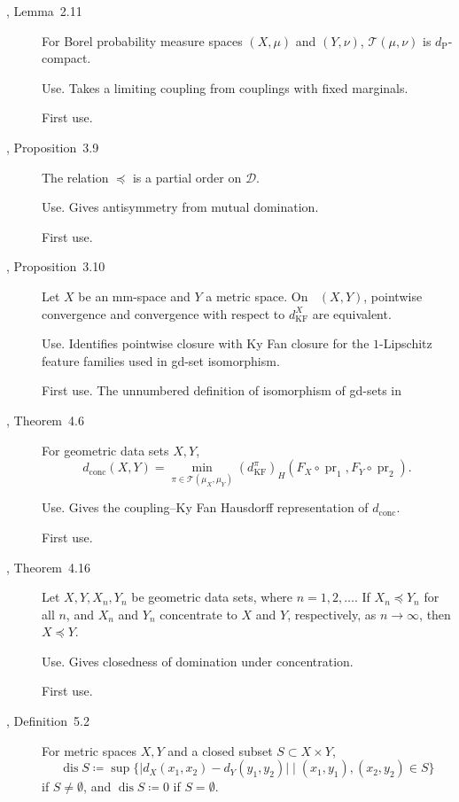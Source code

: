 \documentclass{amsart}
\theoremstyle{plain}
\theoremstyle{definition}
\theoremstyle{remark}
\newcommand{\D}{\mathcal{D}}
\DeclareMathOperator{\lipone}{Lip_1}
\DeclareMathOperator{\dis}{dis}
\DeclareMathOperator{\pr}{pr}
\newcommand{\dconc}{d_{\operatorname{conc}}}
\newcommand{\dpr}{d_{\operatorname{P}}}
\newcommand{\kf}{d_{\operatorname{KF}}}
\newcommand{\haus}[1]{\left(#1\right)_H}
\newcommand{\Tplan}{\mathcal{T}}
\begin{document}
\begin{description}
\item[\cite{gds1}, Lemma~2.11]
For Borel probability measure spaces $(X,\mu)$ and $(Y,\nu)$, $\Tplan(\mu,\nu)$ is $\dpr$-compact.

\textup{Use.} Takes a limiting coupling from couplings with fixed marginals.

\textup{First use.} 

\item[\cite{gds1}, Proposition~3.9]
The relation $\preceq$ is a partial order on $\D$.

\textup{Use.} Gives antisymmetry from mutual domination.

\textup{First use.} 

\item[\cite{gds1}, Proposition~3.10]
Let $X$ be an mm-space and $Y$ a metric space. On $\lipone(X,Y)$, pointwise convergence and convergence with respect to $\kf^X$ are equivalent.

\textup{Use.} Identifies pointwise closure with Ky Fan closure for the $1$-Lipschitz feature families used in gd-set isomorphism.

\textup{First use.} The unnumbered definition of isomorphism of gd-sets in 

\item[\cite{gds1}, Theorem~4.6]
For geometric data sets $X,Y$,
\[\dconc(X,Y)=\min_{\pi\in\Tplan(\mu_X,\mu_Y)}\haus{\kf^\pi}(F_X\circ\pr_1,F_Y\circ\pr_2).\]

\textup{Use.} Gives the coupling--Ky Fan Hausdorff representation of $\dconc$.

\textup{First use.} 

\item[\cite{gds1}, Theorem~4.16]
Let $X,Y,X_n,Y_n$ be geometric data sets, where $n=1,2,\ldots$. If $X_n\preceq Y_n$ for all $n$, and $X_n$ and $Y_n$ concentrate to $X$ and $Y$, respectively, as $n\to\infty$, then $X\preceq Y$.

\textup{Use.} Gives closedness of domination under concentration.

\textup{First use.} 

\item[\cite{gds1}, Definition~5.2]
For metric spaces $X,Y$ and a closed subset $S\subset X\times Y$,
\[\dis S\coloneqq\sup\{\lvert d_X(x_1,x_2)-d_Y(y_1,y_2)\rvert\mid(x_1,y_1),(x_2,y_2)\in S\}\]
if $S\ne\emptyset$, and $\dis S\coloneqq0$ if $S=\emptyset$.


\end{description}
\end{document}

